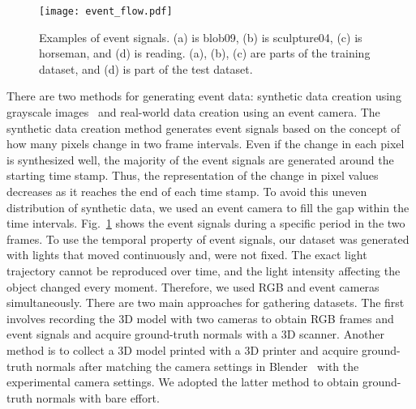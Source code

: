 \documentclass[preprint,12pt,authoryear]{elsarticle}
\begin{document}
\begin{figure}[t]
    \centering
    \texttt{[image: event\_flow.pdf]}
    \caption{Examples of event signals. (a) is blob09, (b) is sculpture04, (c) is horseman, and (d) is reading. (a), (b), (c) are parts of the training dataset, and (d) is part of the test dataset.}
    \label{fig:event_flow}
\end{figure}
There are two methods for generating event data: synthetic data creation using grayscale images~\citep{hu2021v2e} and real-world data creation using an event camera. The synthetic data creation method generates event signals based on the concept of how many pixels change in two frame intervals. Even if the change in each pixel is synthesized well, the majority of the event signals are generated around the starting time stamp. Thus, the representation of the change in pixel values decreases as it reaches the end of each time stamp. To avoid this uneven distribution of synthetic data, we used an event camera to fill the gap within the time intervals. Fig.~\ref{fig:event_flow} shows the event signals during a specific period in the two frames. To use the temporal property of event signals, our dataset was generated with lights that moved continuously and, were not fixed. The exact light trajectory cannot be reproduced over time, and the light intensity affecting the object changed every moment. Therefore, we used RGB and event cameras simultaneously. There are two main approaches for gathering datasets. The first involves recording the 3D model with two cameras to obtain RGB frames and event signals and acquire ground-truth normals with a 3D scanner. Another method is to collect a 3D model printed with a 3D printer and acquire ground-truth normals after matching the camera settings in Blender~\citep{blender} with the experimental camera settings. We adopted the latter method to obtain ground-truth normals with bare effort.
\end{document}
